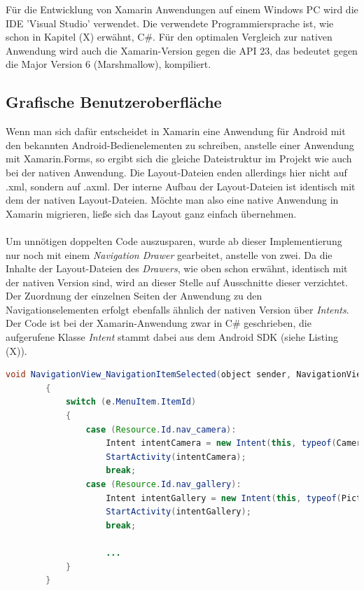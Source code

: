 Für die Entwicklung von Xamarin Anwendungen auf einem Windows PC wird die IDE 'Visual Studio' verwendet. Die verwendete Programmiersprache ist, wie schon in Kapitel (X) erwähnt, C\#. Für den optimalen Vergleich zur nativen Anwendung wird auch die Xamarin-Version gegen die API 23, das bedeutet gegen die Major Version 6 (Marshmallow), kompiliert. 

\subsection{Grafische Benutzeroberfläche}

Wenn man sich dafür entscheidet in Xamarin eine Anwendung für Android mit den bekannten Android-Bedienelementen zu schreiben, anstelle einer Anwendung mit Xamarin.Forms, so ergibt sich die gleiche Dateistruktur im Projekt wie auch bei der nativen Anwendung. Die Layout-Dateien enden allerdings hier nicht auf .xml, sondern auf .axml. Der interne Aufbau der Layout-Dateien ist identisch mit dem der nativen Layout-Dateien. Möchte man also eine native Anwendung in Xamarin migrieren, ließe sich das Layout ganz einfach übernehmen. 
\\
\\
Um unnötigen doppelten Code auszusparen, wurde ab dieser Implementierung nur noch mit einem \textit{Navigation Drawer} gearbeitet, anstelle von zwei. Da die Inhalte der Layout-Dateien des \textit{Drawers}, wie oben schon erwähnt, identisch mit der nativen Version sind, wird an dieser Stelle auf Ausschnitte dieser verzichtet. Der Zuordnung der einzelnen Seiten der Anwendung zu den Navigationselementen erfolgt ebenfalls ähnlich der nativen Version über \textit{Intents}. Der Code ist bei der Xamarin-Anwendung zwar in C\# geschrieben, die aufgerufene Klasse \textit{Intent} stammt dabei aus dem Android SDK (siehe Listing (X)). 

\begin{lstlisting}[caption=Zuweisung der einzelnen Seiten der Anwendung zu den Navigationselementen im Navigation Drawer, label=lst:ZuordnungNavigationselemente, language=Java]
void NavigationView_NavigationItemSelected(object sender, NavigationView.NavigationItemSelectedEventArgs e)
        {
            switch (e.MenuItem.ItemId)
            {
                case (Resource.Id.nav_camera):
                    Intent intentCamera = new Intent(this, typeof(CameraActivity));
                    StartActivity(intentCamera);
                    break;
                case (Resource.Id.nav_gallery):
                    Intent intentGallery = new Intent(this, typeof(PictureGalleryActivity));
                    StartActivity(intentGallery);
                    break;
                    
                    ...
            }
        }
\end{lstlisting}


